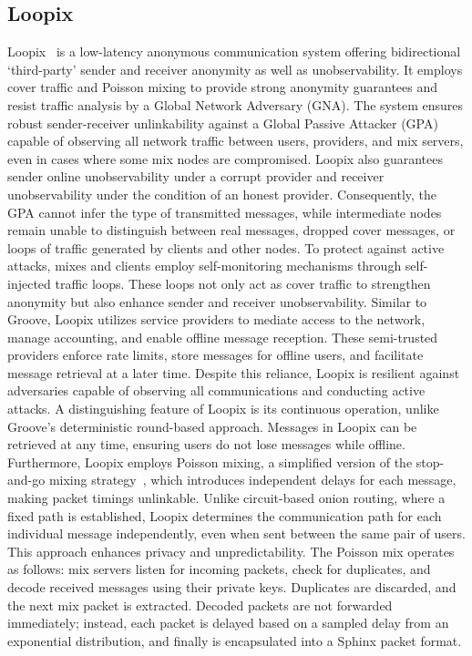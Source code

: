 \subsection{Loopix}\label{subsec:loopix}
Loopix~\cite{Loopix} is a low-latency anonymous communication system offering bidirectional `third-party' sender and receiver anonymity as well as unobservability. It employs cover traffic and Poisson mixing to provide strong anonymity guarantees and resist traffic analysis by a Global Network Adversary (GNA).
The system ensures robust sender-receiver unlinkability against a Global Passive Attacker (GPA) capable of observing all network traffic between users, providers, and mix servers, even in cases where some mix nodes are compromised. Loopix also guarantees sender online unobservability under a corrupt provider and receiver unobservability under the condition of an honest provider. Consequently, the GPA cannot infer the type of transmitted messages, while intermediate nodes remain unable to distinguish between real messages, dropped cover messages, or loops of traffic generated by clients and other nodes.
To protect against active attacks, mixes and clients employ self-monitoring mechanisms through self-injected traffic loops. These loops not only act as cover traffic to strengthen anonymity but also enhance sender and receiver unobservability.
Similar to Groove, Loopix utilizes service providers to mediate access to the network, manage accounting, and enable offline message reception. These semi-trusted providers enforce rate limits, store messages for offline users, and facilitate message retrieval at a later time. Despite this reliance, Loopix is resilient against adversaries capable of observing all communications and conducting active attacks.
A distinguishing feature of Loopix is its continuous operation, unlike Groove's deterministic round-based approach. Messages in Loopix can be retrieved at any time, ensuring users do not lose messages while offline. Furthermore, Loopix employs Poisson mixing, a simplified version of the stop-and-go mixing strategy~\cite{StopAndGoMixing}, which introduces independent delays for each message, making packet timings unlinkable.
Unlike circuit-based onion routing, where a fixed path is established, Loopix determines the communication path for each individual message independently, even when sent between the same pair of users. This approach enhances privacy and unpredictability.
The Poisson mix operates as follows: mix servers listen for incoming packets, check for duplicates, and decode received messages using their private keys. Duplicates are discarded, and the next mix packet is extracted. Decoded packets are not forwarded immediately; instead, each packet is delayed based on a sampled delay from an exponential distribution, and finally is encapsulated into a Sphinx packet format.

